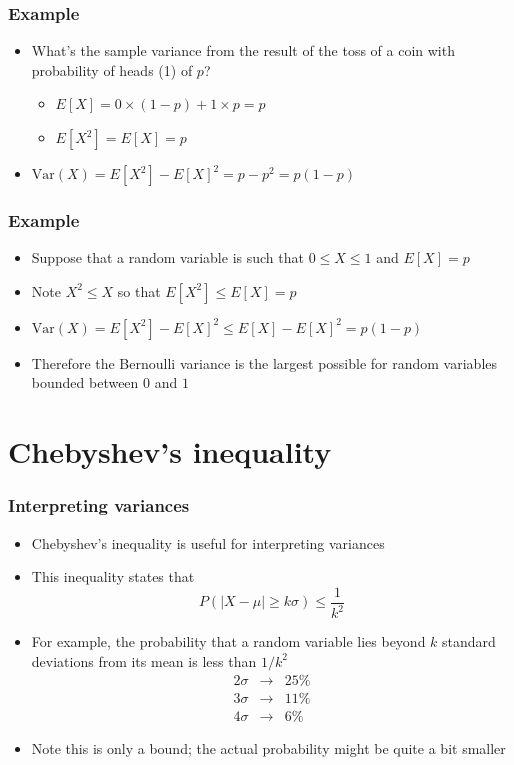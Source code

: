 \documentclass[aspectratio=169]{beamer}
\newcommand{\Var}{\mathrm{Var}}
\begin{document}
\begin{frame}\frametitle{Example}
  \begin{itemize}
  \item  What's the sample variance from the result of the toss of a coin
    with probability of heads (1) of $p$? 
    \begin{itemize}
    \item   $E[X] = 0 \times (1 - p) + 1 \times p = p$
    \item $E[X^2] = E[X] = p$ 
    \end{itemize}
  \item $\Var(X) = E[X^2] - E[X]^2 = p - p^2 = p(1 - p)$
  \end{itemize}
\end{frame}


\begin{frame}\frametitle{Example} 
  \begin{itemize}
  \item Suppose that a random variable is such that $0 \leq X \leq 1$ and $E[X] = p$
  \item Note $X^2 \leq X$ so that $E[X^2] \leq E[X] = p$
  \item $\Var(X) = E[X^2] - E[X]^2 \leq E[X] - E[X]^2 = p(1-p)$
  \item Therefore the Bernoulli variance is the largest possible for random variables bounded between $0$ and $1$
  \end{itemize}
\end{frame}

\section{Chebyshev's inequality}
\begin{frame}
\frametitle{Interpreting variances}
\begin{itemize}
  \item Chebyshev's inequality is useful for interpreting variances
  \item This inequality states that
    $$
    P(|X - \mu| \geq k\sigma) \leq \frac{1}{k^2}
    $$
  \item For example, the probability that a random variable lies beyond $k$
    standard deviations from its mean is less than $1/k^2$
    \begin{eqnarray*}
      2\sigma & \rightarrow & 25\% \\
      3\sigma & \rightarrow & 11\% \\
      4\sigma & \rightarrow &  6\% 
    \end{eqnarray*}
  \item Note this is only a bound; the actual probability might be
    quite a bit smaller
\end{itemize}
\end{frame}
\end{document}
